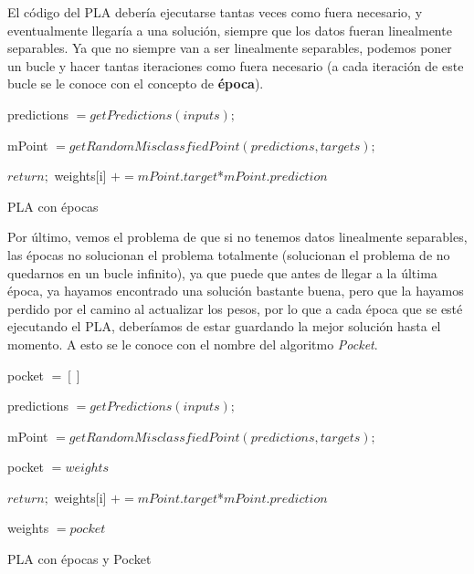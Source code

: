 El código del PLA debería ejecutarse tantas veces como fuera necesario, y eventualmente llegaría a una solución, siempre que los datos fueran linealmente separables. Ya que no siempre van a ser linealmente separables, podemos poner un bucle y hacer tantas iteraciones como fuera necesario (a cada iteración de este bucle se le conoce con el concepto de \textbf{época}).


\newpage
\begin{algorithm}[H]
    {
        predictions $= getPredictions(inputs);$
        
        mPoint $= getRandomMisclassfiedPoint(predictions, targets);$
        
        {
    		$return;$
    	}
    	{
            {
                weights[i] $+= mPoint.target$*$mPoint.prediction$
            }
    	}
	}
	\caption{PLA con épocas}
	\label{alg:plawithepochs}
\end{algorithm}
\vspace{2mm}

Por último, vemos el problema de que si no tenemos datos linealmente separables, las épocas no solucionan el problema totalmente (solucionan el problema de no quedarnos en un bucle infinito), ya que puede que antes de llegar a la última época, ya hayamos encontrado una solución bastante buena, pero que la hayamos perdido por el camino al actualizar los pesos, por lo que a cada época que se esté ejecutando el PLA, deberíamos de estar guardando la mejor solución hasta el momento. A esto se le conoce con el nombre del algoritmo \textit{Pocket}.

\newpage
\begin{algorithm}[H]
    pocket $= []$
    
    {
        predictions $= getPredictions(inputs);$
        
        mPoint $= getRandomMisclassfiedPoint(predictions, targets);$
        
        {
            pocket $= weights$
        }
        
        {
    		$return;$
    	}
    	{
            {
                weights[i] $+= mPoint.target$*$mPoint.prediction$
            }
    	}
	}
	
	{
	    weights $= pocket$
	}
	\caption{PLA con épocas y Pocket}
	\label{alg:plawithepochsandpocket}
\end{algorithm}
\vspace{2mm}

